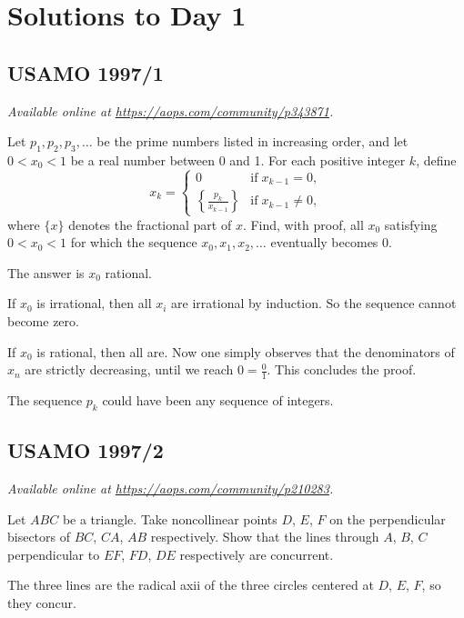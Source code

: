 \documentclass[11pt]{scrartcl}
\begin{document}
\section{Solutions to Day 1}
\subsection{USAMO 1997/1}
\textsl{Available online at \url{https://aops.com/community/p343871}.}
\begin{mdframed}[style=mdpurplebox,frametitle={Problem statement}]
Let $p_1, p_2, p_3, \dots$ be the prime numbers
listed in increasing order,
and let $0 < x_0 < 1$ be a real number between 0 and 1.
For each positive integer $k$, define
\[ x_k = \begin{cases} 0 & \mbox{if} \; x_{k-1} = 0, \\[.1in]
  {\displaystyle \left\{ \frac{p_k}{x_{k-1}} \right\}}
  & \mbox{if} \; x_{k-1} \neq 0,
  \end{cases}  \]
where $\{x\}$ denotes the fractional part of $x$.
Find, with proof, all $x_0$ satisfying $0 < x_0 < 1$
for which the sequence $x_0, x_1, x_2, \dots$ eventually becomes $0$.
\end{mdframed}
The answer is $x_0$ rational.

If $x_0$ is irrational, then all $x_i$ are irrational by induction.
So the sequence cannot become zero.

If $x_0$ is rational, then all are.
Now one simply observes that the denominators of $x_n$
are strictly decreasing, until we reach $0 = \frac 01$.
This concludes the proof.

\begin{remark*}
  The sequence $p_k$ could have been any sequence of integers.
\end{remark*}
\pagebreak

\subsection{USAMO 1997/2}
\textsl{Available online at \url{https://aops.com/community/p210283}.}
\begin{mdframed}[style=mdpurplebox,frametitle={Problem statement}]
Let $ABC$ be a triangle.
Take noncollinear points $D$, $E$, $F$ on the perpendicular bisectors
of $BC$, $CA$, $AB$ respectively.
Show that the lines through $A$, $B$, $C$
perpendicular to $EF$, $FD$, $DE$ respectively are concurrent.
\end{mdframed}
The three lines are the radical axii of the three circles
centered at $D$, $E$, $F$, so they concur.
\pagebreak
\end{document}
